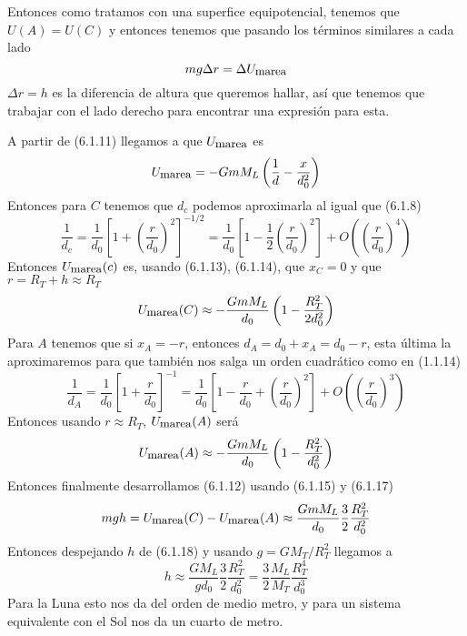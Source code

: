 Entonces como tratamos con una superfice equipotencial, tenemos que $U(A)=U(C)$ y entonces tenemos que pasando los términos similares a cada lado
\begin{equation} \label{6.1.1}
    mg\Delta r = \Delta U_{\mbox{\small marea}}
\end{equation} 
$\Delta r = h$ es la diferencia de altura que queremos hallar, así que tenemos que trabajar con el lado derecho para encontrar una expresión para esta.

A partir de (6.1.11) llegamos a que $U_{\mbox{\small marea}}$ es 
\begin{equation} \label{6.1.1}
    U_{\mbox{\small marea}} = -GmM_L\left(\frac{1}{d}-\frac{x}{d_0^2}\right)
\end{equation} 
Entonces para $C$ tenemos que $d_c$ podemos aproximarla al igual que (6.1.8)
\begin{equation} \label{6.1.1}
    \frac{1}{d_c} = \frac{1}{d_0}\left[1+\left(\frac{r}{d_0}\right)^2\right]^{-1/2} = \frac{1}{d_0}\left[1-\frac{1}{2}\left(\frac{r}{d_0}\right)^2\right] +O\left(\left(\frac{r}{d_0}\right)^4\right)
\end{equation} 
Entonces $U_{\mbox{\small marea}}(c)$ es, usando (6.1.13), (6.1.14), que $x_C=0$ y que $r = R_T+h \approx R_T$
\begin{equation} \label{6.1.1}
    U_{\mbox{\small marea}}(C) \approx -\frac{GmM_L}{d_0}\left(1-\frac{R_T^2}{2d_0^2}\right)
\end{equation} 
Para $A$ tenemos que si $x_A = -r$, entonces $d_A = d_0+x_A =d_0-r$, esta última la aproximaremos para que también nos salga un orden cuadrático como en  (1.1.14)
\begin{equation} \label{6.1.1}
    \frac{1}{d_A} = \frac{1}{d_0}\left[1+\frac{r}{d_0}\right]^{-1} = \frac{1}{d_0}\left[1-\frac{r}{d_0} + \left(\frac{r}{d_0}\right)^2\right] +O\left(\left(\frac{r}{d_0}\right)^3\right)
\end{equation} 
Entonces usando $r \approx R_T$, $U_{\mbox{\small marea}}(A)$ será
\begin{equation} \label{6.1.1}
    U_{\mbox{\small marea}}(A) \approx -\frac{GmM_L}{d_0}\left(1-\frac{R_T^2}{d_0^2}\right)
\end{equation} 
Entonces finalmente desarrollamos (6.1.12) usando (6.1.15) y (6.1.17)
\begin{equation} \label{6.1.1}
mgh = U_{\mbox{\small marea}}(C)-U_{\mbox{\small marea}}(A) \approx \frac{GmM_L}{d_0} \frac{3}{2} \frac{R_T^2}{d_0^2}
\end{equation} 
Entonces despejando $h$ de (6.1.18) y usando $g=GM_T/R_T^2$ llegamos a
\begin{equation} \label{6.1.1}
    h \approx \frac{GM_L}{gd_0} \frac{3}{2} \frac{R_T^2}{d_0^2} = \frac{3}{2} \frac{M_L}{M_T} \frac{R_T^4}{d_0^3} 
    \end{equation} 
Para la Luna esto nos da del orden de medio metro, y para un sistema equivalente con el Sol nos da un cuarto de metro.

